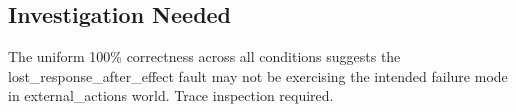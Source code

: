 \subsection{Investigation Needed}
The uniform 100\% correctness across all conditions suggests the lost\_response\_after\_effect fault may not be exercising the intended failure mode in external\_actions world. Trace inspection required.

